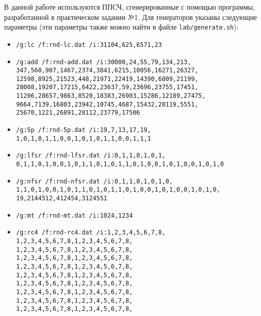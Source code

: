 \documentclass[spec, och, labwork]{SCWorks}
\begin{document}
В данной работе используются ППСЧ, сгенерированные с помощью программы,
разработанной в практическом задании №1. Для генераторов указаны следующие
параметры (эти параметры также можно найти в файле \texttt{lab/generate.sh}):
\begin{itemize}
  \item \texttt{/g:lc /f:rnd-lc.dat /i:31104,625,6571,23}
  \item \texttt{/g:add /f:rnd-add.dat /i:30000,24,55,79,134,213,\\
    347,560,907,1467,2374,3841,6215,10056,16271,26327,\\
    12598,8925,21523,448,21971,22419,14390,6809,21199,\\
    28008,19207,17215,6422,23637,59,23696,23755,17451,\\
    11206,28657,9863,8520,18383,26903,15286,12189,27475,\\
    9664,7139,16803,23942,10745,4687,15432,20119,5551,\\
    25670,1221,26891,28112,23779,17506}
  \item \texttt{/g:5p /f:rnd-5p.dat /i:19,7,13,17,19,\\
    1,0,1,0,1,1,0,0,1,0,1,0,1,1,0,0,1,1,1}
  \item \texttt{/g:lfsr /f:rnd-lfsr.dat /i:0,1,1,0,1,0,1,\\
    0,1,1,0,1,0,0,1,0,1,1,0,1,0,1,1,0,1,0,0,1,0,1,0,0,1,0,1,0}
  \item \texttt{/g:nfsr /f:rnd-nfsr.dat /i:0,1,1,0,1,0,1,0,\\
    1,1,0,1,0,0,1,0,1,1,0,1,0,1,1,0,1,0,0,1,0,1,0,0,1,0,1,0,\\
    19,2144512,412454,3124551}
  \item \texttt{/g:mt   /f:rnd-mt.dat   /i:1024,1234}
  \item \texttt{/g:rc4  /f:rnd-rc4.dat  /i:1,2,3,4,5,6,7,8,\\
    1,2,3,4,5,6,7,8,1,2,3,4,5,6,7,8,\\
    1,2,3,4,5,6,7,8,1,2,3,4,5,6,7,8,\\
    1,2,3,4,5,6,7,8,1,2,3,4,5,6,7,8,\\
    1,2,3,4,5,6,7,8,1,2,3,4,5,6,7,8,\\
    1,2,3,4,5,6,7,8,1,2,3,4,5,6,7,8,\\
    1,2,3,4,5,6,7,8,1,2,3,4,5,6,7,8,\\
    1,2,3,4,5,6,7,8,1,2,3,4,5,6,7,8,\\
    1,2,3,4,5,6,7,8,1,2,3,4,5,6,7,8,\\
    1,2,3,4,5,6,7,8,1,2,3,4,5,6,7,8,\\
}
\end{itemize}
\end{document}
